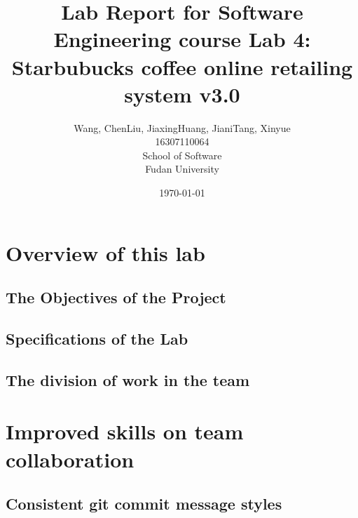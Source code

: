 \documentclass[a4paper]{report}
\title{Lab Report for Software Engineering course \newline
 Lab 4: Starbubucks coffee online retailing system v3.0}
\author{Wang, Chen\qquad Liu, Jiaxing\qquad Huang, Jiani\qquad Tang, Xinyue \\
16307110064\qquad17302010049\qquad 17302010063\qquad 16307110476 \\
School of Software\\
Fudan University
}
\date{\today}
\begin{document}
\maketitle

\tableofcontents
\chapter{Overview of this lab}
\section{The Objectives of the Project}
\section{Specifications of the Lab}
\section{The division of work in the team}
\chapter{Improved skills on team collaboration}
\section{Consistent git commit message styles}
\end{document}
